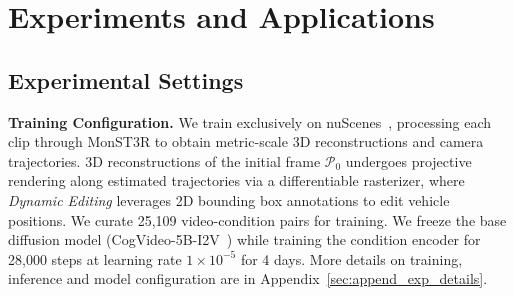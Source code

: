 \documentclass{article}
\begin{document}




\section{Experiments and Applications}
\label{sec:experiments}


\subsection{Experimental Settings}
\label{sec:implementation}

\textbf{Training Configuration.} We train exclusively on nuScenes~\cite{caesar2020nuscenes}, processing each clip through MonST3R to obtain metric-scale 3D reconstructions and camera trajectories. 
3D reconstructions of the initial frame $\mathcal{P}_0$ undergoes projective rendering along estimated trajectories via a differentiable rasterizer, where \textit{Dynamic Editing} leverages 2D bounding box annotations to edit vehicle positions. 
We curate 25,109 video-condition pairs for training. We freeze the base diffusion model (CogVideo-5B-I2V~\cite{hong2022cogvideo}) while training the condition encoder for 28,000 steps at learning rate 
$1\times10^{-5}$ for 4 days. More details on training, inference and model configuration are in Appendix~\ref{sec:append_exp_details}.
\end{document}
